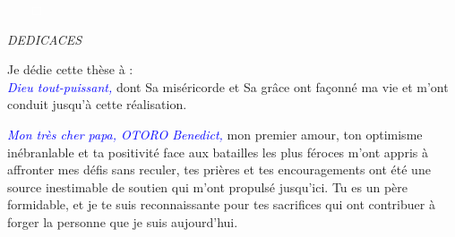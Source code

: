 \pagebreak

\begin{itemize}
  \item[\textcolor{white}{$\Box$}] 
\end{itemize}


\vspace{9cm}

\begin{tcolorbox}[
  colback=white, %
  colframe={newcolor}, %
  coltext={newcolor}, %
  boxrule=1mm, %
  arc=3mm, %
  width=10cm, %
  height=2cm, %
  fontupper=\bfseries, %
  center, %
  valign=center %
]
\fontsize{40}{48}\selectfont %
\hspace{1cm} \emph{DEDICACES}
\end{tcolorbox}

\pagebreak


\noindent Je dédie cette thèse à :\\

\noindent \emph{\textcolor{blue}{Dieu tout-puissant,}} dont Sa miséricorde et Sa grâce ont façonné ma vie et m'ont conduit jusqu'à cette réalisation. \vspace*{1em}

\noindent \emph{\textcolor{blue}{Mon très cher papa, OTORO Benedict,}} mon premier amour, ton optimisme inébranlable et ta positivité face aux batailles les plus féroces m'ont appris à affronter mes défis sans reculer, tes prières et tes encouragements ont été une source inestimable de soutien qui m'ont propulsé jusqu'ici. Tu es un père formidable, et je te suis reconnaissante pour tes sacrifices qui ont contribuer à forger la personne que je suis aujourd'hui.\vspace*{1em}

